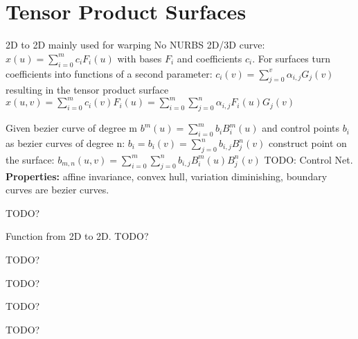 \section{Tensor Product Surfaces}
2D to 2D mainly used for warping
No NURBS
 2D/3D curve: $x(u) = \sum_{i=0}^mc_iF_i(u)$ with bases $F_i$ and coefficients $c_i$. For surfaces turn coefficients into functions of a second parameter: $c_i(v) = \sum_{j=0}^v\alpha_{i,j}G_j(v)$ resulting in the tensor product surface $x(u,v) = \sum_{i=0}^mc_i(v)F_i(u) = \sum_{i=0}^m\sum_{j=0}^n\alpha_{i,j}F_i(u)G_j(v)$

 Given bezier curve of degree m $b^m(u) = \sum_{i=0}^mb_iB_i^m(u)$ and control points $b_i$ as bezier curves of degree n: $b_i = b_i(v) = \sum_{j=0}^nb_{i,j}B_j^n(v)$ construct point on the surface: $b_{m,n}(u,v) = \sum_{i=0}^m\sum_{j=0}^nb_{i,j}B_i^m(u)B_j^n(v)$ TODO: Control Net. \\
\textbf{Properties:} affine invariance, convex hull, variation diminishing, boundary curves are bezier curves.

 TODO?

 Function from 2D to 2D. TODO?

 TODO?

 TODO?

 TODO?

 TODO?